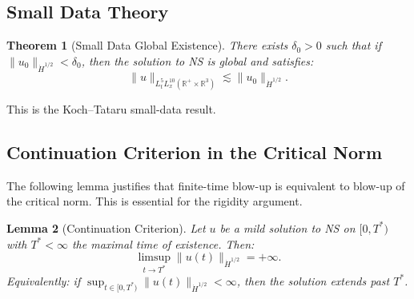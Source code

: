 \documentclass[11pt]{article}
\newtheorem{theorem}{Theorem}[section]
\newtheorem{lemma}[theorem]{Lemma}
\theoremstyle{definition}
\newcommand{\R}{\mathbb{R}}
\begin{document}
\subsection{Small Data Theory}

\begin{theorem}[Small Data Global Existence]\label{thm:small-data}
There exists $\delta_0 > 0$ such that if $\|u_0\|_{\dot{H}^{1/2}} < \delta_0$, then the solution to NS is global and satisfies:
\begin{equation}
\|u\|_{L^5_t L^{10}_x(\R^+ \times \R^3)} \lesssim \|u_0\|_{\dot{H}^{1/2}}.
\end{equation}
\end{theorem}

This is the Koch--Tataru \cite{KT} small-data result.

\subsection{Continuation Criterion in the Critical Norm}

The following lemma justifies that finite-time blow-up is equivalent to blow-up of the critical norm. This is essential for the rigidity argument.

\begin{lemma}[Continuation Criterion]\label{lem:continuation}
Let $u$ be a mild solution to NS on $[0, T^*)$ with $T^* < \infty$ the maximal time of existence. Then:
\begin{equation}
\limsup_{t \to T^*} \|u(t)\|_{\dot{H}^{1/2}} = +\infty.
\end{equation}
Equivalently: if $\sup_{t \in [0,T^*)} \|u(t)\|_{\dot{H}^{1/2}} < \infty$, then the solution extends past $T^*$.
\end{lemma}
\end{document}

